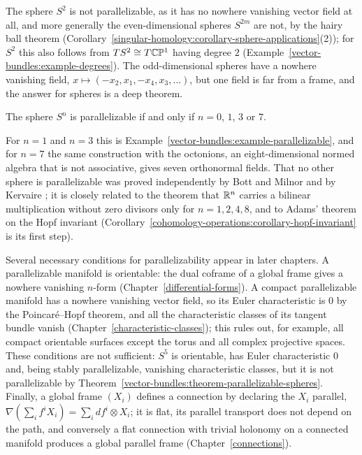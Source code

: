 The sphere $S^2$ is not parallelizable, as it has no nowhere vanishing vector field at all, and more generally the even-dimensional spheres $S^{2m}$ are not, by the hairy ball theorem
(Corollary~\ref{singular-homology:corollary-sphere-applications}(2)); for $S^2$ this also follows from $TS^2 \cong T\mathbb{C}\mathbb{P}^1$ having degree $2$ (Example~\ref{vector-bundles:example-degrees}). The odd-dimensional spheres
have a nowhere vanishing field, $x \mapsto (-x_2, x_1, -x_4, x_3, \ldots)$, but one field is far from a frame, and the answer for spheres is a deep theorem.

\begin{theorem}\label{vector-bundles:theorem-parallelizable-spheres}
The sphere $S^n$ is parallelizable if and only if $n = 0$, $1$, $3$ or $7$.
\end{theorem}

For $n = 1$ and $n = 3$ this is Example~\ref{vector-bundles:example-parallelizable}, and for $n = 7$ the same construction with the octonions, an eight-dimensional normed algebra that is not associative,
gives seven orthonormal fields. That no other sphere is parallelizable was proved independently by Bott and Milnor \cite{bott-milnor-1958} and by Kervaire \cite{kervaire-1958}; it is closely related to
the theorem that $\mathbb{R}^n$ carries a bilinear multiplication without zero divisors only for $n = 1, 2, 4, 8$, and to Adams' theorem on the Hopf invariant \cite{adams-1960}
(Corollary~\ref{cohomology-operations:corollary-hopf-invariant} is its first step).

\begin{remark}\label{vector-bundles:remark-parallelizable-obstructions}
Several necessary conditions for parallelizability appear in later chapters. A parallelizable manifold is orientable: the dual coframe of a global frame gives a nowhere vanishing $n$-form
(Chapter~\ref{differential-forms}). A compact parallelizable manifold has a nowhere vanishing vector field, so its Euler characteristic is $0$ by the Poincar\'e--Hopf theorem, and all the characteristic
classes of its tangent bundle vanish (Chapter~\ref{characteristic-classes}); this rules out, for example, all compact orientable surfaces except the torus and all complex projective spaces. These
conditions are not sufficient: $S^5$ is orientable, has Euler characteristic $0$ and, being stably parallelizable, vanishing characteristic classes, but it is not parallelizable by
Theorem~\ref{vector-bundles:theorem-parallelizable-spheres}. Finally, a global frame $(X_i)$ defines a connection by declaring the $X_i$ parallel, $\nabla(\sum_if^iX_i) = \sum_idf^i \otimes X_i$; it is flat, its
parallel transport does not depend on the path, and conversely a flat connection with trivial holonomy on a connected manifold produces a global parallel frame (Chapter~\ref{connections}).
\end{remark}

